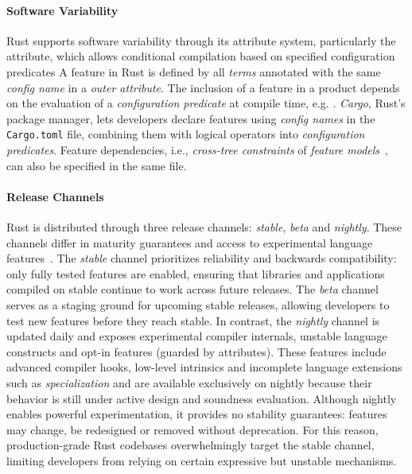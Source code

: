 \paragraph{Software Variability}
Rust supports software variability through its attribute system, particularly the  attribute, which allows conditional compilation based on specified configuration predicates
A feature in Rust is defined by all \textit{terms} annotated with the same \textit{config name} in a  \textit{outer attribute}.
The inclusion of a feature in a product depends on the evaluation of a \textit{configuration predicate} at compile time, e.g. . 
\textit{Cargo}, Rust's package manager, lets developers declare features using \textit{config names} in the \texttt{Cargo.toml} file, combining them with logical operators into \textit{configuration predicates}.
Feature dependencies, i.e., \textit{cross-tree constraints} of \textit{feature models}~\cite{Kang90,Seidl16,Karatas10}, can also be specified in the same file.

\paragraph{Release Channels}
Rust is distributed through three release channels: \textit{stable}, \textit{beta} and \textit{nightly}.
These channels differ in maturity guarantees and access to experimental language features~\cite{RustReleaseChannels}.
The \textit{stable} channel prioritizes reliability and backwards compatibility: only fully tested features are enabled, ensuring that libraries and applications compiled on stable continue to work across future releases.
The \textit{beta} channel serves as a staging ground for upcoming stable releases, allowing developers to test new features before they reach stable.
In contrast, the \textit{nightly} channel is updated daily and exposes experimental compiler internals, unstable language constructs and opt-in features (guarded by \inlinerust{#![feature(...)]} attributes).
These features include advanced compiler hooks, low-level intrinsics and incomplete language extensions such as \textit{specialization} and are available exclusively on nightly because their behavior is still under active design and soundness evaluation.
Although nightly enables powerful experimentation, it provides no stability guarantees: features may change, be redesigned or removed without deprecation.
For this reason, production-grade Rust codebases overwhelmingly target the stable channel, limiting developers from relying on certain expressive but unstable mechanisms.

